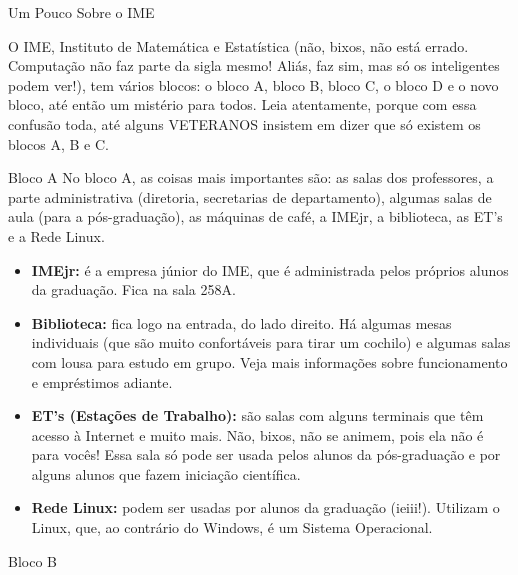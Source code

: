 \begin{secao}{Um Pouco Sobre o IME}

O IME, Instituto de Matemática e Estatística (não, bixos, não está errado. 
Computação não faz parte da sigla mesmo! Aliás, faz sim, mas só os inteligentes 
podem ver!), tem vários blocos: o bloco A, bloco B, bloco C, o bloco D e o 
novo bloco, até então um mistério para todos. Leia atentamente, porque com essa 
confusão toda, até alguns VETERANOS insistem em dizer que só existem os blocos
A, B e C.




\begin{subsecao}{Bloco A}
No bloco A, as coisas mais importantes são: as salas dos professores, a parte
administrativa (diretoria, secretarias de departamento), algumas salas de aula
(para a pós-graduação), as máquinas de café, a IMEjr, a biblioteca, as ET's e
a Rede Linux.

\begin{itemize}

\item {\bf IMEjr:} é a empresa júnior do IME, que é administrada pelos próprios
alunos da graduação. Fica na sala 258A.

\item {\bf Biblioteca:} fica logo na entrada, do lado direito. Há algumas mesas
individuais (que são muito confortáveis para tirar um cochilo) e algumas salas
com lousa para estudo em grupo. Veja mais informações sobre funcionamento e
empréstimos adiante.

\item {\bf ET's (Estações de Trabalho):} são salas com alguns terminais que têm
acesso à Internet e muito mais. Não, bixos, não se animem, pois ela não é para
vocês! Essa sala só pode ser usada pelos alunos da pós-graduação e por alguns
alunos que fazem iniciação científica.

\item {\bf Rede Linux:} podem ser usadas por alunos da graduação (ieiii!).
Utilizam o Linux, que, ao contrário do Windows, é um Sistema Operacional.

\end{itemize}
\end{subsecao}

\begin{subsecao}{Bloco B}


\end{subsecao}
\end{secao}
